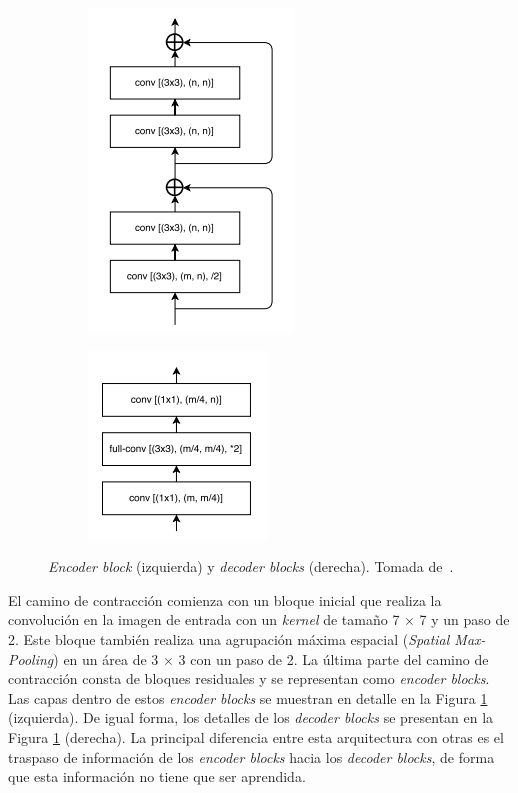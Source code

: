 \begin{figure}[ht]
	\centering
	\begin{subfigure}
		\centering
		\includegraphics[width=.4\linewidth]{./Graphics/encoder.png}
	\end{subfigure}
	\begin{subfigure}
		\centering
		\includegraphics[width=.4\linewidth]{./Graphics/decoder.png}
	\end{subfigure}
	\caption{\textit{Encoder block} (izquierda) y \textit{decoder blocks} (derecha). Tomada de~\cite{chaurasia2017linknet}.}
	\label{fig:blocks}
\end{figure}

El camino de contracción comienza con un bloque inicial que realiza la convolución en la imagen de entrada con un \textit{kernel} de tamaño 7 $\times$ 7 y un paso de 2. Este bloque también realiza una agrupación máxima espacial (\textit{Spatial Max-Pooling}) en un área de 3 $\times$ 3 con un paso de 2. La última parte del camino de contracción consta de bloques residuales y se representan como \textit{encoder blocks}. Las capas dentro de estos \textit{encoder blocks} se muestran en detalle en la Figura \ref{fig:blocks} (izquierda). De igual forma, los detalles de los \textit{decoder blocks} se presentan en la Figura \ref{fig:blocks} (derecha). La principal diferencia entre esta arquitectura con otras es el traspaso de información de los \textit{encoder blocks} hacia los \textit{decoder blocks}, de forma que esta información no tiene que ser aprendida.

